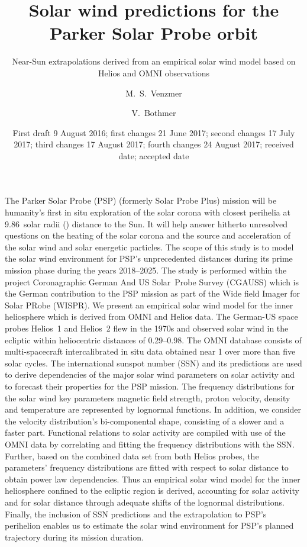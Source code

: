 
\title{Solar wind predictions for the Parker Solar Probe orbit}
\subtitle{Near-Sun extrapolations derived from an empirical solar wind model based on Helios and OMNI observations}

\author{M.~S.~Venzmer
\and V.~Bothmer}


\date{First draft 9 August 2016; first changes 21 June 2017; second changes 17 July 2017; third changes 17 August 2017; fourth changes 24 August 2017; received date; accepted date}

\abstract
{The Parker Solar Probe (PSP) (formerly Solar Probe Plus) mission will be humanity’s first in situ exploration of the solar corona with closest perihelia at \num{9.86}~solar radii (\si{\Rs}) distance to the Sun. It will help answer hitherto unresolved questions on the heating of the solar corona and the source and acceleration of the solar wind and solar energetic particles. The scope of this study is to model the solar wind environment for PSP’s unprecedented distances during its prime mission phase during the years \numrange{2018}{2025}. The study is performed within the project Coronagraphic German And US Solar~Probe Survey (CGAUSS) which is the German contribution to the PSP mission as part of the Wide field Imager for Solar PRobe (WISPR).}	%
{We present an empirical solar wind model for the inner heliosphere which is derived from OMNI and Helios data. The German-US space probes Helios~1 and Helios~2 flew in the 1970s and observed solar wind in the ecliptic within heliocentric distances of \SIrange{0.29}{0.98}{\au}. The OMNI database consists of multi-spacecraft intercalibrated in situ data obtained near \SI{1}{\au} over more than five solar cycles. The international sunspot number (SSN) and its predictions are used to derive dependencies of the major solar wind parameters on solar activity and to forecast their properties for the PSP mission.}	%
{The frequency distributions for the solar wind key parameters magnetic field strength, proton velocity, density and temperature are represented by lognormal functions. In addition, we consider the velocity distribution’s bi-componental shape, consisting of a slower and a faster part. Functional relations to solar activity are compiled with use of the OMNI data by correlating and fitting the frequency distributions with the SSN. Further, based on the combined data set from both Helios probes, the parameters’ frequency distributions are fitted with respect to solar distance to obtain power law dependencies. Thus an empirical solar wind model for the inner heliosphere confined to the ecliptic region is derived, accounting for solar activity and for solar distance through adequate shifts of the lognormal distributions. Finally, the inclusion of SSN predictions and the extrapolation to PSP’s perihelion enables us to estimate the solar wind environment for PSP’s planned trajectory during its mission duration.}	%
